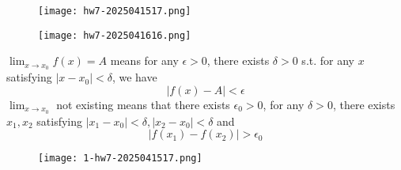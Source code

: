 \begin{exercise}
\begin{figure}[H]
\centering
\texttt{[image: hw7-2025041517.png]}
\label{}
\end{figure}
\end{exercise}
\begin{figure}[H]
\centering
\texttt{[image: hw7-2025041616.png]}
\label{}
\end{figure}
$\lim_{ x \to x_0 }f(x)=A$ means for any $\epsilon>0$, there exists $\delta>0$ s.t. for any $x$ satisfying $\lvert x-x_0 \rvert<\delta$, we have
\[
\lvert f(x)-A \rvert <\epsilon
\]
$\lim_{ x \to x_0 }$ not existing means that there exists $\epsilon_0>0$, for any $\delta>0$, there exists $x_1,x_2$ satisfying $\lvert x_1-x_0 \rvert<\delta,\lvert x_2-x_0 \rvert<\delta$ and
\[
\lvert f(x_1)-f(x_2) \rvert >\epsilon_0
\]
\begin{exercise}
\begin{figure}[H]
\centering
\texttt{[image: 1-hw7-2025041517.png]}
\label{}
\end{figure}\label{f5f813}
\end{exercise}

